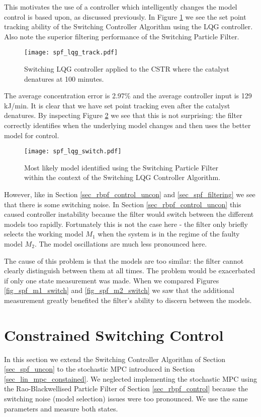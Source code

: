 This motivates the use of a controller which intelligently changes the model control is based upon, as discussed previously. In Figure \ref{fig_spf_lqg_track} we see the set point tracking ability of the Switching Controller Algorithm using the LQG controller. Also note the superior filtering performance of the Switching Particle Filter.
\begin{figure}[H] 
\centering
\texttt{[image: spf\_lqg\_track.pdf]}
\caption{Switching LQG controller applied to the CSTR where the catalyst denatures at 100 minutes.}
\label{fig_spf_lqg_track}
\end{figure}
The average concentration error is 2.97\% and the average controller input is 129 kJ/min. It is clear that we have set point tracking even after the catalyst denatures. By inspecting Figure \ref{fig_spf_lqg_switch} we see that this is not surprising: the filter correctly identifies when the underlying model changes and then uses the better model for control. 
\begin{figure}[H] 
\centering
\texttt{[image: spf\_lqg\_switch.pdf]}
\caption{Most likely model identified using the Switching Particle Filter within the context of the Switching LQG Controller Algorithm.}
\label{fig_spf_lqg_switch}
\end{figure}
However, like in Section \ref{sec_rbpf_control_uncon} and \ref{sec_spf_filtering} we see that there is some switching noise. In Section \ref{sec_rbpf_control_uncon} this caused controller instability because the filter would switch between the different models too rapidly. Fortunately this is not the case here - the filter only briefly selects the working model $M_1$ when the system is in the regime of the faulty model $M_2$. The model oscillations are much less pronounced here.

The cause of this problem is that the models are too similar: the filter cannot clearly distinguish between them at all times. The problem would be exacerbated if only one state measurement was made. When we compared Figures \ref{fig_spf_m1_switch} and \ref{fig_spf_m2_switch} we saw that the additional measurement greatly benefited the filter's ability to discern between the models.

\section{Constrained Switching Control} 
In this section we extend the Switching Controller Algorithm of Section \ref{sec_spf_uncon} to the stochastic MPC introduced in Section \ref{sec_lin_mpc_constained}. We neglected implementing the stochastic MPC using the Rao-Blackwellised Particle Filter of Section \ref{sec_rbpf_control} because the switching noise (model selection) issues were too pronounced. We use the same parameters and measure both states. 

